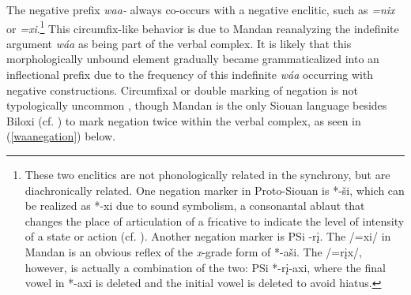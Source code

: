 The negative prefix \textit{waa-} always co-occurs with a negative enclitic, such as \textit{=nix} or \textit{=xi}.\footnote{These two enclitics are not phonologically related in the synchrony, but are diachronically related. One negation marker in Proto-Siouan is *-ši, which can be realized as *-xi due to sound symbolism, a consonantal ablaut that changes the place of articulation of a fricative to indicate the level of intensity of a state or action (cf. ). Another negation marker is PSi -rį. The /=xi/ in Mandan is an obvious reflex of the \textit{x}-grade form of *-aši. The /=rįx/, however, is actually a combination of the two: PSi *-rį-axi, where the final vowel in *-axi is deleted and the initial vowel is deleted to avoid hiatus.} This circumfix-like behavior is due to Mandan reanalyzing the indefinite argument \textit{wáa} as being part of the verbal complex. It is likely that this morphologically unbound element gradually became grammaticalized into an inflectional prefix due to the frequency of this indefinite \textit{wáa} occurring with negative constructions. Circumfixal or double marking of negation is not typologically uncommon \citep[630]{caffareletal2004}, though Mandan is the only Siouan language besides Biloxi (cf. \citealt[86]{einaudi1976}) to mark negation twice within the verbal complex, as seen in (\ref{waanegation}) below.

